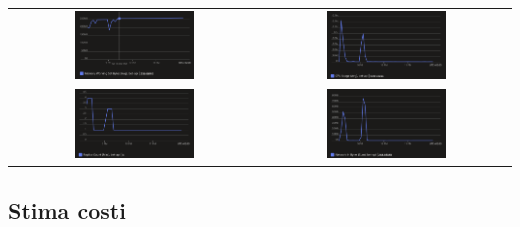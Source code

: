 \begin{tabular}{ c c }
    \includegraphics[width=0.5\textwidth]{img/load_test/bet-api-mem-avg.png} & \includegraphics[width=0.5\textwidth]{img/load_test/bet-api-cpu-avg.png} \\
    \includegraphics[width=0.5\textwidth]{img/load_test/bet-api-rep-count.png} & \includegraphics[width=0.5\textwidth]{img/load_test/bet-api-rx-sum.png} \\
\end{tabular}



\subsection{Stima costi}















